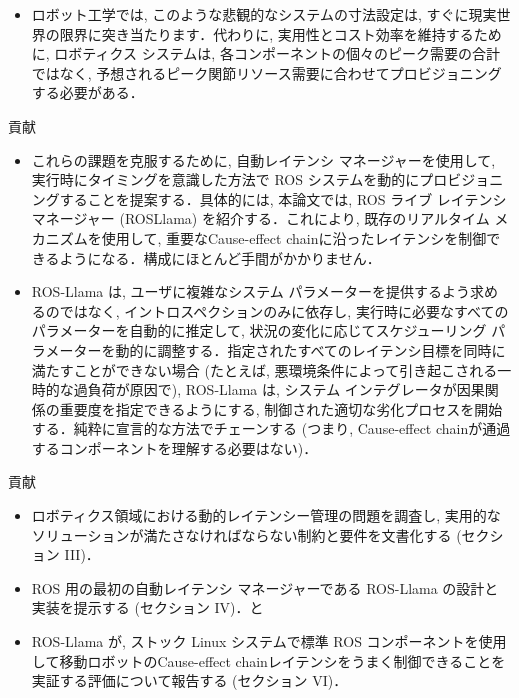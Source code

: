 \begin{frame}{}
\begin{itemize}
\item ロボット工学では, このような悲観的なシステムの寸法設定は, すぐに現実世界の限界に突き当たります．代わりに, 実用性とコスト効率を維持するために, ロボティクス システムは, 各コンポーネントの個々のピーク需要の合計ではなく, 予想されるピーク関節リソース需要に合わせてプロビジョニングする必要がある．
\end{itemize}
\end{frame}

\begin{frame}{貢献}
\begin{itemize}
\item これらの課題を克服するために, 自動レイテンシ マネージャーを使用して, 実行時にタイミングを意識した方法で ROS システムを動的にプロビジョニングすることを提案する．具体的には, 本論文では, ROS ライブ レイテンシ マネージャー (ROSLlama) を紹介する．これにより, 既存のリアルタイム メカニズムを使用して, 重要なCause-effect chainに沿ったレイテンシを制御できるようになる．構成にほとんど手間がかかりません．
\end{itemize}
\end{frame}

\begin{frame}{}
\begin{itemize}
\item ROS-Llama は, ユーザに複雑なシステム パラメーターを提供するよう求めるのではなく, イントロスペクションのみに依存し, 実行時に必要なすべてのパラメーターを自動的に推定して, 状況の変化に応じてスケジューリング パラメーターを動的に調整する．指定されたすべてのレイテンシ目標を同時に満たすことができない場合 (たとえば, 悪環境条件によって引き起こされる一時的な過負荷が原因で), ROS-Llama は, システム インテグレータが因果関係の重要度を指定できるようにする, 制御された適切な劣化プロセスを開始する．純粋に宣言的な方法でチェーンする (つまり, Cause-effect chainが通過するコンポーネントを理解する必要はない)．
\end{itemize}
\end{frame}

\begin{frame}{貢献}
    \begin{itemize}
        \item  ロボティクス領域における動的レイテンシー管理の問題を調査し, 実用的なソリューションが満たさなければならない制約と要件を文書化する (セクション III)．

        \item  ROS 用の最初の自動レイテンシ マネージャーである ROS-Llama の設計と実装を提示する (セクション IV)．と

        \item  ROS-Llama が, ストック Linux システムで標準 ROS コンポーネントを使用して移動ロボットのCause-effect chainレイテンシをうまく制御できることを実証する評価について報告する (セクション VI)．

    \end{itemize}
\end{frame}

